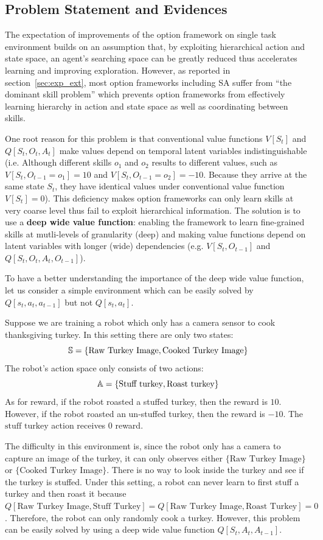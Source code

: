\subsection{Problem Statement and Evidences}
\label{sec:append_turkey}

The expectation of improvements of the option framework on single
task environment builds on an assumption that, by exploiting
hierarchical action and state space, an agent's searching space
can be greatly reduced thus accelerates learning and improving
exploration. However, as reported in section~\ref{sec:exp_ext},
most option frameworks including SA suffer from ``the dominant
skill problem'' \cite{zhang2019dac} which prevents option
frameworks from effectively learning hierarchy in action and
state space as well as coordinating between skills.

One root reason for this problem is that conventional value
functions $V[S_t]$ and $Q[S_t,O_t,A_t]$ make values depend on
temporal latent variables indistinguishable (i.e. Although
different skills $o_1$ and $o_2$ results to different values,
such as $V[S_t,O_{t-1}=o_1]=10$ and $V[S_t,O_{t-1}=o_2]=-10$.
Because they arrive at the same state $S_t$, they have identical
values under conventional value function $V[S_t]=0$). This
deficiency makes option frameworks can only learn skills at very
coarse level thus fail to exploit hierarchical information. The
solution is to use a \textbf{deep wide value function}: enabling
the framework to learn fine-grained skills at mutli-levels of
granularity (deep) and making value functions depend on latent
variables with longer (wide) dependencies (e.g. $V[S_t,O_{t-1}]$
and $Q[S_t,O_t,A_t,O_{t-1}]$).

To have a better understanding the importance of the deep wide
value function, let us consider a simple environment which can be
easily solved by $Q[s_t,a_t,a_{t-1}]$ but not $Q[s_t,a_t]$.

Suppose we are training a robot which only has a camera sensor to
cook thanksgiving turkey. In this setting there are only two
states:
% 
$${\mathbb{S}}=\{\text{Raw Turkey Image},\text{Cooked Turkey
  Image}\}$$
%
The robot's action space only consists of two
actions:
%
$${\mathbb{A}}=\{\text{Stuff turkey},\text{Roast turkey}\}$$
%
As for reward, if the robot roasted a stuffed turkey, then the
reward is $10$. However, if the robot roasted an un-stuffed
turkey, then the reward is $-10$. The $\text{stuff turkey}$
action receives $0$ reward.

The difficulty in this environment is, since the robot only has a
camera to capture an image of the turkey, it can only observes
either $\{\text{Raw Turkey Image}\}$ or $\{\text{Cooked Turkey
  Image}\}$. There is no way to look inside the turkey and see if
the turkey is stuffed. Under this setting, a robot can never
learn to first stuff a turkey and then roast it because
$Q[\text{Raw Turkey Image},\text{Stuff Turkey}] = Q[\text{Raw
  Turkey Image},\text{Roast Turkey}] = 0$. Therefore, the robot
can only randomly cook a turkey. However, this problem can be
easily solved by using a deep wide value function
$Q[S_t,A_t,A_{t-1}]$.

